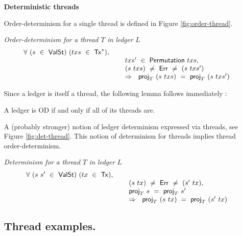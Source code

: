 \textbf{Deterministic threads}


Order-determinism for a single thread is defined in Figure \ref{fig:order-thread}.

\begin{figure*}[htb]
  \emph{Order-determinism for a thread $T$ in ledger $L$}
  \begin{equation*}
    \begin{array}{l@{~~}l@{~~}ll}
      \forall~(s~\in~\type{ValSt})~(txs~\in~\seqof{\type{Tx}}),~\\
      & ~~~~txs'~\in~\fun{Permutation}~txs,~\\
      & ~~~~(s~txs)~\neq~\Err~\neq~(s~txs') \\
      & ~~~~\Rightarrow~~\fun{proj}_{T}~(s~txs)~=~\fun{proj}_{T}~(s~txs')
    \end{array}
  \end{equation*}
  \caption{Order-determinism for a single thread}
  \label{fig:order-thread}
\end{figure*}

Since a ledger is itself a thread, the following lemma follows immediately :

\begin{lemma}
  A ledger is OD if and only if all of its threads are.
\end{lemma}

A (probably stronger) notion of ledger determinism expressed via threads, see Figure \ref{fig:det-thread}.
This notion of determinism for threads implies thread order-determinism.


\begin{figure*}[htb]
  \emph{Determinism for a thread $T$ in ledger $L$}
  \begin{equation*}
    \begin{array}{l@{~~}l@{~~}ll}
      \forall~(s~s'~\in~\type{ValSt})~(tx~\in~\type{Tx}),~\\
      & ~~~~(s~tx)~\neq~\Err~\neq~(s'~tx), \\
      & ~~~~\fun{proj}_{T}~s~=~\fun{proj}_{T}~s' \\
      & ~~~~\Rightarrow~~\fun{proj}_{T}~(s~tx)~=~\fun{proj}_{T}~(s'~tx)
    \end{array}
  \end{equation*}
  \caption{Determinism for a single thread}
  \label{fig:det-thread}
\end{figure*}

\subsection{Thread examples.}

